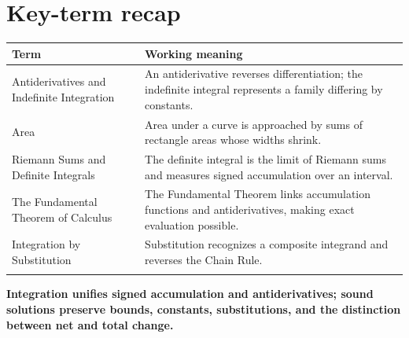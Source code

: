\documentclass[11pt]{article}
\begin{document}
\section{Key-term recap}
\small
\begin{longtable}{@{}>{\RaggedRight\arraybackslash}p{}>{\RaggedRight\arraybackslash}p{}@{}}
\toprule
\textbf{Term} & \textbf{Working meaning}\\
\midrule\endhead
Antiderivatives and Indefinite Integration & An antiderivative reverses differentiation; the indefinite integral represents a family differing by constants. \\\addlinespace[2pt]
Area & Area under a curve is approached by sums of rectangle areas whose widths shrink. \\\addlinespace[2pt]
Riemann Sums and Definite Integrals & The definite integral is the limit of Riemann sums and measures signed accumulation over an interval. \\\addlinespace[2pt]
The Fundamental Theorem of Calculus & The Fundamental Theorem links accumulation functions and antiderivatives, making exact evaluation possible. \\\addlinespace[2pt]
Integration by Substitution & Substitution recognizes a composite integrand and reverses the Chain Rule. \\\addlinespace[2pt]
\bottomrule
\end{longtable}
\normalsize

\enlargethispage{4\baselineskip}
\begin{tcolorbox}[title=One-sentence takeaway,fonttitle=\bfseries,colback=Ink,colframe=Ink,coltext=white,coltitle=white,arc=2mm,boxrule=0pt]
\centering\bfseries Integration unifies signed accumulation and antiderivatives; sound solutions preserve bounds, constants, substitutions, and the distinction between net and total change.
\end{tcolorbox}
\end{document}
